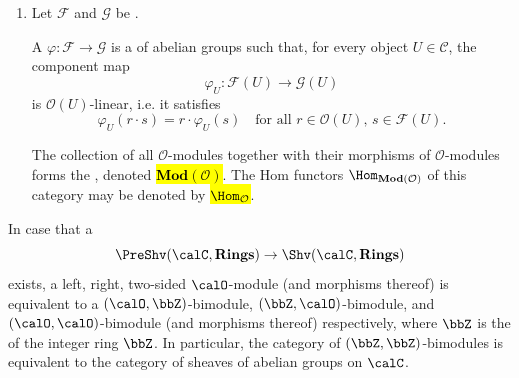 \begin{definition}
\begin{enumerate}
\begin{enumerate}
            \item Let $\mathcal{F}$ and $\mathcal{G}$ be .

            A  $\varphi: \mathcal{F} \to \mathcal{G}$ is a  of abelian groups such that, for every object $U \in \mathcal{C}$, the component map
            $$\varphi_U : \mathcal{F}(U) \to \mathcal{G}(U)$$
            is $\mathcal{O}(U)$-linear, i.e. it satisfies
            $$\varphi_U(r \cdot s) = r \cdot \varphi_U(s) \quad \text{for all } r \in \mathcal{O}(U), \, s \in \mathcal{F}(U).$$

            The collection of all $\mathcal{O}$-modules together with their morphisms of $\mathcal{O}$-modules forms the , denoted \hl{$\mathbf{Mod}(\mathcal{O})$}. The Hom functors $\Hom_{\mathbf{Mod}(\mathcal{O})}$ of this category may be denoted by \hl{$\Hom_{\mathcal{O}}$}.

        \end{enumerate}

        \noindent In case that a  
        $$\PreShv(\calC, \mathbf{Rings}) \to \Shv(\calC, \mathbf{Rings})$$ 
        exists, a left, right, two-sided $\calO$-module (and morphisms thereof) is equivalent to a $(\calO,\bbZ)$-bimodule, $(\bbZ,\calO)$-bimodule, and $(\calO, \calO)$-bimodule (and morphisms thereof) respectively, where $\bbZ$ is the  of the integer ring $\bbZ$. In particular, the category of $(\bbZ,\bbZ)$-bimodules is equivalent to the category of sheaves of abelian groups on $\calC$. 
\end{enumerate}


\end{definition}


